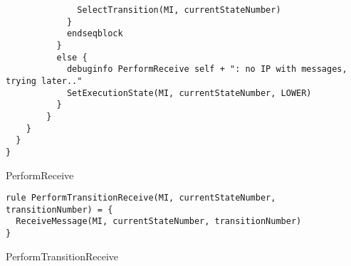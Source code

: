 \begin{listing}[H]
\begin{verbatim}
              SelectTransition(MI, currentStateNumber)
            }
            endseqblock
          }
          else {
            debuginfo PerformReceive self + ": no IP with messages, trying later.."
            SetExecutionState(MI, currentStateNumber, LOWER)
          }
        }
    }
  }
}
\end{verbatim}
\caption{PerformReceive}
\label{lst:asm:PerformReceive}
\end{listing}




\begin{listing}[H]
\begin{verbatim}
rule PerformTransitionReceive(MI, currentStateNumber, transitionNumber) = {
  ReceiveMessage(MI, currentStateNumber, transitionNumber)
}
\end{verbatim}
\caption{PerformTransitionReceive}
\label{lst:asm:PerformTransitionReceive}
\end{listing}




